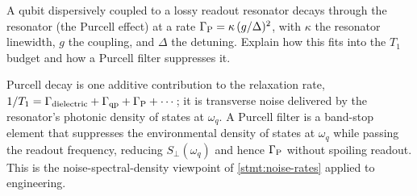 \begin{exercise}
A qubit dispersively coupled to a lossy readout resonator decays
through the resonator (the Purcell effect) at a rate
$\Gamma_{\rm P}=\kappa\,(g/\Delta)^2$, with $\kappa$ the resonator
linewidth, $g$ the coupling, and $\Delta$ the detuning. Explain
how this fits into the $T_1$ budget and how a Purcell filter
suppresses it.
\begin{solution}
Purcell decay is one additive contribution to the relaxation rate,
$1/T_1=\Gamma_{\rm dielectric}+\Gamma_{\rm qp}+\Gamma_{\rm P}+\cdots$;
it is transverse noise delivered by the resonator's photonic
density of states at $\omega_q$. A Purcell filter is a band-stop
element that suppresses the environmental density of states at
$\omega_q$ while passing the readout frequency, reducing
$S_\perp(\omega_q)$ and hence $\Gamma_{\rm P}$ without spoiling
readout. This is the noise-spectral-density viewpoint of
\cref{stmt:noise-rates} applied to engineering.
\end{solution}
\end{exercise}
